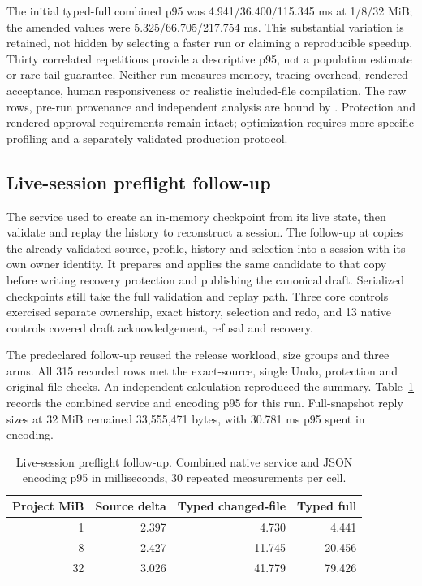 The initial typed-full combined p95 was 4.941/36.400/115.345 ms at 1/8/32 MiB;
the amended values were 5.325/66.705/217.754 ms. This substantial variation is
retained, not hidden by selecting a faster run or claiming a reproducible
speedup. Thirty correlated repetitions provide a descriptive p95, not a
population estimate or rare-tail guarantee. Neither run measures memory,
tracing overhead, rendered acceptance, human responsiveness or realistic
included-file compilation. The raw rows, pre-run provenance and independent
analysis are bound by .
Protection and rendered-approval requirements remain intact; optimization
requires more specific profiling and a separately validated production protocol.

\subsection{Live-session preflight follow-up}
\label{sec:trusted-preflight}
The service used to create an in-memory checkpoint from its live state, then
validate and replay the history to reconstruct a session.
The follow-up at  copies the already validated source, profile,
history and selection into a session with its own owner identity. It
prepares and applies the same candidate to that copy before writing recovery
protection and publishing the canonical draft. Serialized checkpoints still
take the full validation and replay path. Three core controls exercised
separate ownership, exact history, selection and redo, and 13 native controls
covered draft acknowledgement, refusal and recovery.

The predeclared follow-up reused the release workload, size groups and three
arms. All 315 recorded rows met the exact-source, single Undo, protection and
original-file checks. An independent calculation reproduced the summary.
Table~\ref{tab:trusted-preflight} records the combined service and encoding
p95 for this run. Full-snapshot reply sizes at 32 MiB remained 33,555,471 bytes,
with 30.781 ms p95 spent in encoding.

\begin{table}[htbp]
\small\centering
\begin{tabular}{@{}rrrr@{}}
\toprule
Project MiB & Source delta & Typed changed-file & Typed full\\
\midrule
1 & 2.397 & 4.730 & 4.441\\
8 & 2.427 & 11.745 & 20.456\\
32 & 3.026 & 41.779 & 79.426\\
\bottomrule
\end{tabular}
\caption{Live-session preflight follow-up. Combined native service and JSON
encoding p95 in milliseconds, 30 repeated measurements per cell.}
\label{tab:trusted-preflight}
\end{table}

